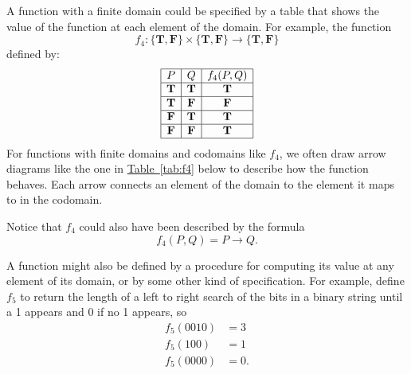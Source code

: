 \documentclass[11pt,oneside]{book}
\theoremstyle{definition}
\newcommand{\T}{\mathbf{T}}
\newcommand{\F}{\mathbf{F}}
\begin{document}
A function with a finite domain could be specified by a table that shows the value of the function at each element of the domain.
For example, the function
\[ f_{4}: \{ \T, \F \} \times \{ \T, \F \} \to \{ \T, \F \} \]
defined by:
\[\begin{array}{|c|c|c|}
    \hline
    P & Q & f_{4}(P, Q) \\
    \hline
    \T & \T & \T \\
    \hline
    \T & \F & \F \\
    \hline
    \F & \T & \T \\
    \hline
    \F & \F & \T \\
    \hline
\end{array}\]
For functions with finite domains and codomains like $f_{4}$, we often draw arrow diagrams like the one in \hyperref[tab:f4]{Table~\ref*{tab:f4}} below to describe how the function behaves.
Each arrow connects an element of the domain to the element it maps to in the codomain.
\begin{table}[H]
\centering
{}
\caption{$f_{4}$ as an arrow diagram} \label{tab:f4}
\end{table}
Notice that $f_{4}$ could also have been described by the formula
\[ f_{4}(P, Q) = P \rightarrow Q. \]

A function might also be defined by a procedure for computing its value at any element of its domain, or by some other kind of specification.
For example, define $f_{5}$ to return the length of a left to right search of the bits in a binary string until a 1 appears and 0 if no 1 appears, so
\begin{align*}
    f_{5}(0010) &= 3 \\
    f_{5}(100) &= 1 \\
    f_{5}(0000) &= 0.
\end{align*}
\end{document}
